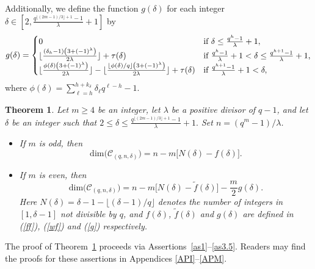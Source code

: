 \documentclass[journal,onecolumn]{IEEEtran}
\newtheorem{theorem}{Theorem}
\begin{document}
Additionally, we define the function $g(\delta)$ for each integer $\delta\in \left[2, \frac{q^{\lfloor (2m-1)/3\rfloor+1}-1}{\lambda}+1\right]$ by 
\begin{equation}\label{g}
    g(\delta)= \begin{cases}
    0&\hbox{if }\delta\leq \frac{q^h-1}{\lambda}+1,\\
\lfloor \frac{(\delta_h-1)\left(3+(-1)^{\lambda}
            \right)}{2\lambda}\rfloor+\tau(\delta)
    & \hbox{if }\frac{q^h-1}{\lambda}+1<\delta\leq \frac{q^{h+1}-1}{\lambda}+1,\\
        \lfloor  \frac{\phi(\delta)\left(3+(-1)^{\lambda}
            \right)}{2\lambda} \rfloor -\lfloor  \frac{\lfloor \phi(\delta)/q \rfloor\left(3+(-1)^{\lambda}
            \right) }{2\lambda}   \rfloor +\tau(\delta) &\hbox{if } \frac{q^{h+1}-1}{\lambda}+1<\delta, 
    \end{cases}
\end{equation}
where $\phi(\delta)=\sum\limits_{\ell=h}^{h+k_{\delta}}\delta_{\ell}q^{\ell-h}-1$.
\begin{theorem}\label{odda}
Let $m\ge 4$ be an integer,  let $\lambda$ be a positive divisor of $q-1$, and  let $\delta$ be an integer such that $
2 \le \delta \le \frac{q^{\lfloor (2m-1)/3\rfloor+1}-1}{\lambda}+1.
$
Set $n=(q^{m}-1)/\lambda$.  
\begin{itemize}
    \item 
If $m$ is odd, then
\begin{equation}\label{th31}
\mathrm{dim}\bigl(\mathcal{C}_{(q,n,\delta)}\bigr)
= n - m\bigl[N(\delta)-f(\delta)\bigr].
\end{equation}
\item 
If $m$ is even, then
\begin{equation}\label{th311}
\mathrm{dim}\bigl(\mathcal{C}_{(q,n,\delta)}\bigr)
= n - m\bigl[N(\delta)-\widetilde{f}(\delta)\bigr]
- \frac{m}{2}g(\delta). 
\end{equation}
Here  $N(\delta) = \delta -1 - \lfloor (\delta-1)/q\rfloor$ denotes the number of integers in $[1,\delta-1] $ not divisible by $q$, and   $f(\delta)$,   $\widetilde{f}(\delta)$ and $g(\delta)$ are defined in (\ref{ff}), (\ref{wf}) and (\ref{g}) respectively. 
\end{itemize}
\end{theorem}


The proof of Theorem~\ref{odda} proceeds via Assertions~\ref{as1}--\ref{as3.5}. Readers may find the proofs for these assertions  in Appendices \ref{API}--\ref{APM}.  
\end{document}
